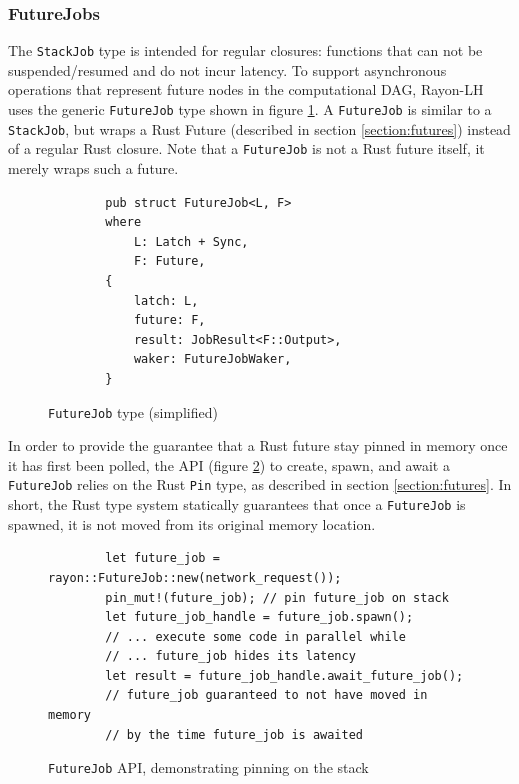 \documentclass[bsc,frontabs,singlespacing,parskip,deptreport,normalheadings]{infthesis}
\begin{document}
\subsubsection*{FutureJobs}

The \texttt{StackJob} type is intended for regular closures: functions that can
not be suspended/resumed and do not incur latency. To support asynchronous
operations that represent future nodes in the computational DAG, Rayon-LH uses
the generic \texttt{FutureJob} type shown in figure \ref{fig:futurejob}. A
\texttt{FutureJob} is similar to a \texttt{StackJob}, but wraps a Rust Future
(described in section \ref{section:futures}) instead of a regular
Rust closure. Note that a \texttt{FutureJob} is not a Rust future itself, it
merely wraps such a future.

\begin{figure}[ht]
    \begin{verbatim}
        pub struct FutureJob<L, F>
        where
            L: Latch + Sync,
            F: Future,
        {
            latch: L,
            future: F,
            result: JobResult<F::Output>,
            waker: FutureJobWaker,
        }
    \end{verbatim}
    \caption{\texttt{FutureJob} type (simplified)}
    \label{fig:futurejob}
\end{figure}

In order to provide the guarantee that a Rust future stay pinned in memory once
it has first been polled, the API (figure \ref{fig:future_job_api}) to create,
spawn, and await a \texttt{FutureJob} relies on the Rust \texttt{Pin} type, as
described in section \ref{section:futures}. In short, the Rust type
system statically guarantees that once a \texttt{FutureJob} is spawned, it is
not moved from its original memory location.

\begin{figure}[ht]
    \begin{verbatim}
        let future_job = rayon::FutureJob::new(network_request());
        pin_mut!(future_job); // pin future_job on stack
        let future_job_handle = future_job.spawn();
        // ... execute some code in parallel while
        // ... future_job hides its latency
        let result = future_job_handle.await_future_job(); 
        // future_job guaranteed to not have moved in memory
        // by the time future_job is awaited
    \end{verbatim}
    \caption{\texttt{FutureJob} API, demonstrating pinning on the stack}
    \label{fig:future_job_api}
\end{figure}
\end{document}
